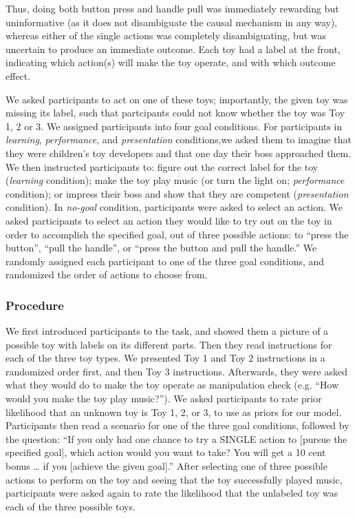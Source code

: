 \documentclass[10pt, letterpaper]{article}
\begin{document}
Thus, doing both button press and handle pull was immediately rewarding
but uninformative (as it does not disambiguate the causal mechanism in
any way), whereas either of the single actions was completely
disambiguating, but was uncertain to produce an immediate outcome. Each
toy had a label at the front, indicating which action(s) will make the
toy operate, and with which outcome effect.

We asked participants to act on one of these toys; importantly, the
given toy was missing its label, such that partcipants could not know
whether the toy was Toy 1, 2 or 3. We assigned participants into four
goal conditions. For participants in \emph{learning},
\emph{performance}, and \emph{presentation} conditions,we asked them to
imagine that they were children's toy developers and that one day their
boss approached them. We then instructed participants to: figure out the
correct label for the toy (\emph{learning} condition); make the toy play
music (or turn the light on; \emph{performance} condition); or impress
their boss and show that they are competent (\emph{presentation}
condition). In \emph{no-goal} condition, participants were asked to
select an action. We asked participants to select an action they would
like to try out on the toy in order to accomplish the specified goal,
out of three possible actions: to ``press the button'', ``pull the
handle'', or ``press the button and pull the handle.'' We randomly
assigned each participant to one of the three goal conditions, and
randomized the order of actions to choose from.

\subsubsection{Procedure}\label{procedure}

We first introduced participants to the task, and showed them a picture
of a possible toy with labels on its different parts. Then they read
instructions for each of the three toy types. We presented Toy 1 and Toy
2 instructions in a randomized order first, and then Toy 3 instructions.
Afterwards, they were asked what they would do to make the toy operate
as manipulation check (e.g. ``How would you make the toy play music?'').
We asked participants to rate prior likelihood that an unknown toy is
Toy 1, 2, or 3, to use as priors for our model. Participants then read a
scenario for one of the three goal conditions, followed by the question:
``If you only had one chance to try a SINGLE action to {[}pursue the
specified goal{]}, which action would you want to take? You will get a
10 cent bonus \ldots{} if you {[}achieve the given goal{]}.'' After
selecting one of three possible actions to perform on the toy and seeing
that the toy successfully played music, participants were asked again to
rate the likelihood that the unlabeled toy was each of the three
possible toys.
\end{document}
